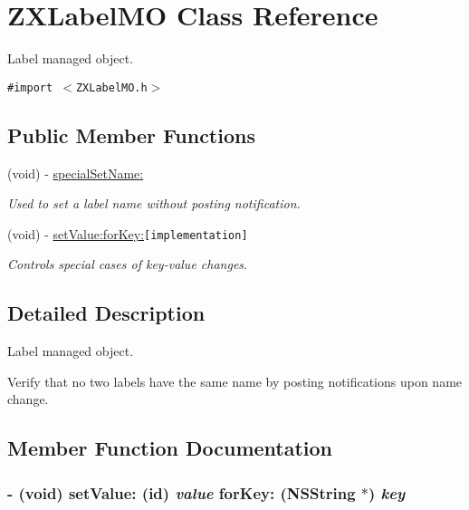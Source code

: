 \hypertarget{interface_z_x_label_m_o}{
\section{ZXLabelMO Class Reference}
\label{interface_z_x_label_m_o}
}
Label managed object.  


{\tt \#import $<$ZXLabelMO.h$>$}

\subsection*{Public Member Functions}
\begin{CompactItemize}
\item 
\hypertarget{interface_z_x_label_m_o_dc62383d23935f9cd45897d5835181dc}{
(void) - \hyperlink{interface_z_x_label_m_o_dc62383d23935f9cd45897d5835181dc}{specialSetName:}}
\label{interface_z_x_label_m_o_dc62383d23935f9cd45897d5835181dc}

\begin{CompactList}\small\item\em Used to set a label name without posting notification. \item\end{CompactList}\item 
(void) - \hyperlink{interface_z_x_label_m_o_1f64b30333ddb010cf343336cf32d3f1}{setValue:forKey:}{\tt  \mbox{[}implementation\mbox{]}}
\begin{CompactList}\small\item\em Controls special cases of key-value changes. \item\end{CompactList}\end{CompactItemize}


\subsection{Detailed Description}
Label managed object. 

Verify that no two labels have the same name by posting notifications upon name change. 

\subsection{Member Function Documentation}
\hypertarget{interface_z_x_label_m_o_1f64b30333ddb010cf343336cf32d3f1}{
\subsubsection[{setValue:forKey:}]{\setlength{\rightskip}{0pt plus 5cm}- (void) setValue: (id) {\em value}\/ forKey: (NSString $\ast$) {\em key}}}
\label{interface_z_x_label_m_o_1f64b30333ddb010cf343336cf32d3f1}


